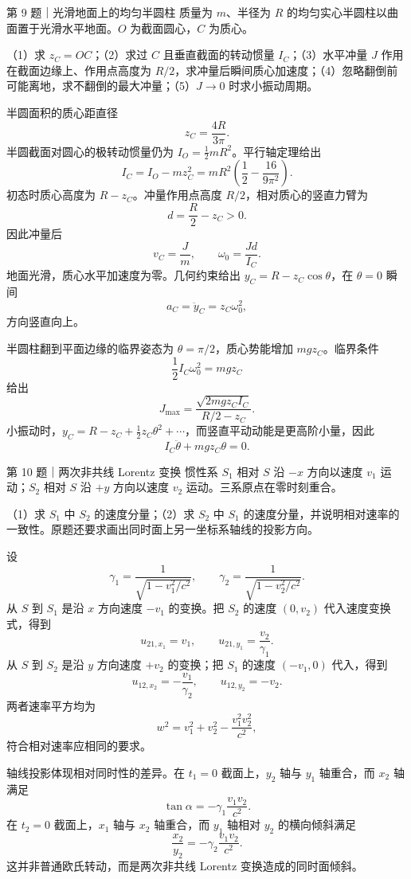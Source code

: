 \begin{problem}{第 9 题｜光滑地面上的均匀半圆柱}
质量为 $m$、半径为 $R$ 的均匀实心半圆柱以曲面置于光滑水平地面。$O$ 为截面圆心，$C$ 为质心。

（1）求 $z_C=OC$；（2）求过 $C$ 且垂直截面的转动惯量 $I_C$；（3）水平冲量 $J$ 作用在截面边缘上、作用点高度为 $R/2$，求冲量后瞬间质心加速度；（4）忽略翻倒前可能离地，求不翻倒的最大冲量；（5）$J\to0$ 时求小振动周期。
\FigSemicylinder
\end{problem}
\begin{solution}
半圆面积的质心距直径
\[
z_C=\frac{4R}{3\pi}.
\]
半圆截面对圆心的极转动惯量仍为 $I_O=\frac12mR^2$。平行轴定理给出
\[
I_C=I_O-mz_C^2
=mR^2\left(\frac12-\frac{16}{9\pi^2}\right).
\]
初态时质心高度为 $R-z_C$。冲量作用点高度 $R/2$，相对质心的竖直力臂为
\[
d=\frac R2-z_C>0.
\]
因此冲量后
\[
v_C=\frac Jm,
\qquad
\omega_0=\frac{Jd}{I_C}.
\]
地面光滑，质心水平加速度为零。几何约束给出 $y_C=R-z_C\cos\theta$，在 $\theta=0$ 瞬间
\[
a_C=\ddot y_C=z_C\omega_0^2,
\]
方向竖直向上。

半圆柱翻到平面边缘的临界姿态为 $\theta=\pi/2$，质心势能增加 $mgz_C$。临界条件
\[
\frac12I_C\omega_0^2=mgz_C
\]
给出
\[
J_{\max}=\frac{\sqrt{2mgz_CI_C}}{R/2-z_C}.
\]
小振动时，$y_C=R-z_C+\frac12z_C\theta^2+\cdots$，而竖直平动动能是更高阶小量，因此
\[
I_C\ddot\theta+mgz_C\theta=0.
\]
\end{solution}

\begin{problem}{第 10 题｜两次非共线 Lorentz 变换}
惯性系 $S_1$ 相对 $S$ 沿 $-x$ 方向以速度 $v_1$ 运动；$S_2$ 相对 $S$ 沿 $+y$ 方向以速度 $v_2$ 运动。三系原点在零时刻重合。

（1）求 $S_1$ 中 $S_2$ 的速度分量；（2）求 $S_2$ 中 $S_1$ 的速度分量，并说明相对速率的一致性。原题还要求画出同时面上另一坐标系轴线的投影方向。
\FigRelFrames
\end{problem}
\begin{solution}
设
\[
\gamma_1=\frac1{\sqrt{1-v_1^2/c^2}},
\qquad
\gamma_2=\frac1{\sqrt{1-v_2^2/c^2}}.
\]
从 $S$ 到 $S_1$ 是沿 $x$ 方向速度 $-v_1$ 的变换。把 $S_2$ 的速度 $(0,v_2)$ 代入速度变换式，得到
\[
\boxed{u_{21,x_1}=v_1,\qquad u_{21,y_1}=\frac{v_2}{\gamma_1}}.
\]
从 $S$ 到 $S_2$ 是沿 $y$ 方向速度 $+v_2$ 的变换；把 $S_1$ 的速度 $(-v_1,0)$ 代入，得到
\[
\boxed{u_{12,x_2}=-\frac{v_1}{\gamma_2},\qquad u_{12,y_2}=-v_2}.
\]
两者速率平方均为
\[
w^2=v_1^2+v_2^2-\frac{v_1^2v_2^2}{c^2},
\]
符合相对速率应相同的要求。

轴线投影体现相对同时性的差异。在 $t_1=0$ 截面上，$y_2$ 轴与 $y_1$ 轴重合，而 $x_2$ 轴满足
\[
\tan\alpha=-\gamma_1\frac{v_1v_2}{c^2}.
\]
在 $t_2=0$ 截面上，$x_1$ 轴与 $x_2$ 轴重合，而 $y_1$ 轴相对 $y_2$ 的横向倾斜满足
\[
\frac{x_2}{y_2}=-\gamma_2\frac{v_1v_2}{c^2}.
\]
这并非普通欧氏转动，而是两次非共线 Lorentz 变换造成的同时面倾斜。
\end{solution}
